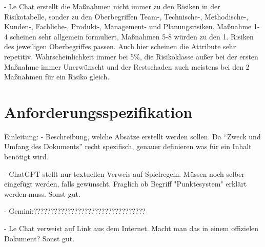 - Le Chat erstellt die Maßnahmen nicht immer zu den Risiken in der Risikotabelle, sonder zu den Oberbegriffen Team-, Technische-, Methodische-, 
Kunden-, Fachliche-, Produkt-, Management- und Planungsrisiken. Maßnahme 1-4 scheinen sehr allgemein formuliert, Maßnahmen 5-8 würden
zu den 1. Risiken des jeweiligen Oberbegriffes passen. Auch hier scheinen die Attribute sehr repetitiv. Wahrscheinlichkeit immer bei 5\%,
die Risikoklasse außer bei der ersten Maßnahme immer Unerwünscht und der Restschaden auch meistens bei den 2 Maßnahmen für ein Risiko gleich.

\section{Anforderungsspezifikation}  \label{CompAnforderungsspezifikation}

Einleitung:
- Beschreibung, welche Absätze erstellt werden sollen. Da ``Zweck und Umfang des Dokuments'' recht spezifisch, genauer definieren was für ein 
Inhalt benötigt wird.

- ChatGPT stellt nur textuellen Verweis auf Spielregeln. Müssen noch selber eingefügt werden, falls gewünscht. Fraglich ob Begriff "Punktesystem"
erklärt werden muss. Sonst gut.

- Gemini:?????????????????????????????????

- Le Chat verweist auf Link aus dem Internet. Macht man das in einem offizielen Dokument? Sonst gut.

